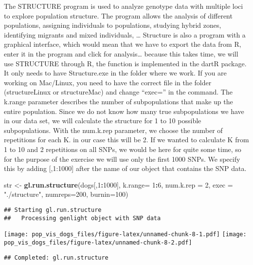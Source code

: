 \documentclass[
]{article}
\newenvironment{Shaded}{\begin{snugshade}}{\end{snugshade}}
\newcommand{\AttributeTok}[1]{\textcolor[rgb]{0.13,0.29,0.53}{#1}}
\newcommand{\DecValTok}[1]{\textcolor[rgb]{0.00,0.00,0.81}{#1}}
\newcommand{\FunctionTok}[1]{\textcolor[rgb]{0.13,0.29,0.53}{\textbf{#1}}}
\newcommand{\NormalTok}[1]{#1}
\newcommand{\OtherTok}[1]{\textcolor[rgb]{0.56,0.35,0.01}{#1}}
\newcommand{\SpecialCharTok}[1]{\textcolor[rgb]{0.81,0.36,0.00}{\textbf{#1}}}
\newcommand{\StringTok}[1]{\textcolor[rgb]{0.31,0.60,0.02}{#1}}
\begin{document}
The STRUCTURE program is used to analyze genotype data with multiple
loci to explore population structure. The program allows the analysis of
different populations, assigning individuals to populations, studying
hybrid zones, identifying migrants and mixed individuals, \ldots{}
Structure is also a program with a graphical interface, which would mean
that we have to export the data from R, enter it in the program and
click for analysis\ldots{} because this takes time, we will use
STRUCTURE through R, the function is implemented in the dartR package.
It only needs to have Structure.exe in the folder where we work. If you
are working on Mac/Linux, you need to have the correct file in the
folder (structureLinux or structureMac) and change ``exec='' in the
command. The k.range parameter describes the number of subpopulations
that make up the entire population. Since we do not know how many true
subpopulations we have in our data set, we will calculate the structure
for 1 to 10 possible subpopulations. With the num.k.rep parameter, we
choose the number of repetitions for each K. in our case this will be 2.
If we wanted to calculate K from 1 to 10 and 2 repetitions on all SNPs,
we would be here for quite some time, so for the purpose of the exercise
we will use only the first 1000 SNPs. We specify this by adding
{[},1:1000{]} after the name of our object that contains the SNP data.

\begin{Shaded}
\begin{Highlighting}[]
\NormalTok{str }\OtherTok{\textless{}{-}} \FunctionTok{gl.run.structure}\NormalTok{(dogs[,}\DecValTok{1}\SpecialCharTok{:}\DecValTok{1000}\NormalTok{], }\AttributeTok{k.range=} \DecValTok{1}\SpecialCharTok{:}\DecValTok{6}\NormalTok{, }\AttributeTok{num.k.rep =} \DecValTok{2}\NormalTok{, }\AttributeTok{exec =} \StringTok{"./structure"}\NormalTok{, }\AttributeTok{numreps=}\DecValTok{200}\NormalTok{, }\AttributeTok{burnin=}\DecValTok{100}\NormalTok{)}
\end{Highlighting}
\end{Shaded}

\begin{verbatim}
## Starting gl.run.structure 
##   Processing genlight object with SNP data
\end{verbatim}

\texttt{[image: pop\_vis\_dogs\_files/figure-latex/unnamed-chunk-8-1.pdf]}
\texttt{[image: pop\_vis\_dogs\_files/figure-latex/unnamed-chunk-8-2.pdf]}

\begin{verbatim}
## Completed: gl.run.structure
\end{verbatim}
\end{document}
